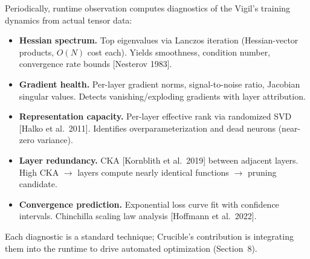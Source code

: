 Periodically, runtime observation computes diagnostics of the Vigil's training dynamics from actual tensor data:

\begin{itemize}
  \item \textbf{Hessian spectrum.} Top eigenvalues via Lanczos iteration (Hessian-vector products, $O(N)$ cost each). Yields smoothness, condition number, convergence rate bounds [Nesterov 1983].
  \item \textbf{Gradient health.} Per-layer gradient norms, signal-to-noise ratio, Jacobian singular values. Detects vanishing/exploding gradients with layer attribution.
  \item \textbf{Representation capacity.} Per-layer effective rank via randomized SVD [Halko et al.\ 2011]. Identifies overparameterization and dead neurons (near-zero variance).
  \item \textbf{Layer redundancy.} CKA [Kornblith et al.\ 2019] between adjacent layers. High CKA $\to$ layers compute nearly identical functions $\to$ pruning candidate.
  \item \textbf{Convergence prediction.} Exponential loss curve fit with confidence intervals. Chinchilla scaling law analysis [Hoffmann et al.\ 2022].
\end{itemize}

Each diagnostic is a standard technique; Crucible's contribution is integrating them into the runtime to drive automated optimization (Section~8).
